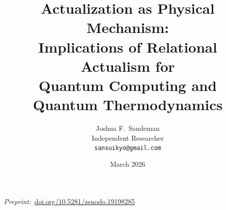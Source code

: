 \documentclass[11pt,a4paper]{article}
\theoremstyle{plain}
\theoremstyle{definition}
\theoremstyle{remark}
\begin{document}
\title{\textbf{Actualization as Physical Mechanism: \\
Implications of Relational Actualism for \\
Quantum Computing and Quantum Thermodynamics}}

\author{Joshua F.\ Sandeman \\
\small Independent Researcher \\
\small \texttt{sansuikyo@gmail.com}}

\date{March 2026}

\maketitle
\begin{center}
  {\small\textit{Preprint:}~\href{https://doi.org/10.5281/zenodo.19198285}
    {doi.org/10.5281/zenodo.19198285}\par}
\end{center}
\end{document}
